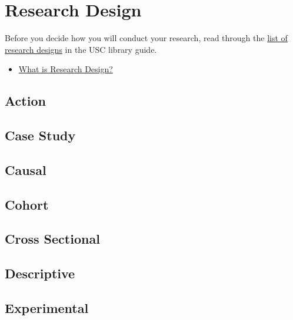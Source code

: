 \documentclass[]{book}
\providecommand{\tightlist}{%
  \setlength{\itemsep}{0pt}\setlength{\parskip}{0pt}}
\begin{document}
\hypertarget{research-design}{%
\chapter{Research Design}\label{research-design}}

Before you decide how you will conduct your research, read through the \href{https://libguides.usc.edu/writingguide/researchdesigns}{list of research designs} in the USC library guide.

\begin{itemize}
\tightlist
\item
  \href{https://www.nyu.edu/classes/bkg/methods/005847ch1.pdf}{What is Research Design?}
\end{itemize}

\hypertarget{action}{%
\section{Action}\label{action}}

\hypertarget{case-study}{%
\section{Case Study}\label{case-study}}

\hypertarget{causal}{%
\section{Causal}\label{causal}}

\hypertarget{cohort}{%
\section{Cohort}\label{cohort}}

\hypertarget{cross-sectional}{%
\section{Cross Sectional}\label{cross-sectional}}

\hypertarget{descriptive}{%
\section{Descriptive}\label{descriptive}}

\hypertarget{experimental}{%
\section{Experimental}\label{experimental}}
\end{document}
